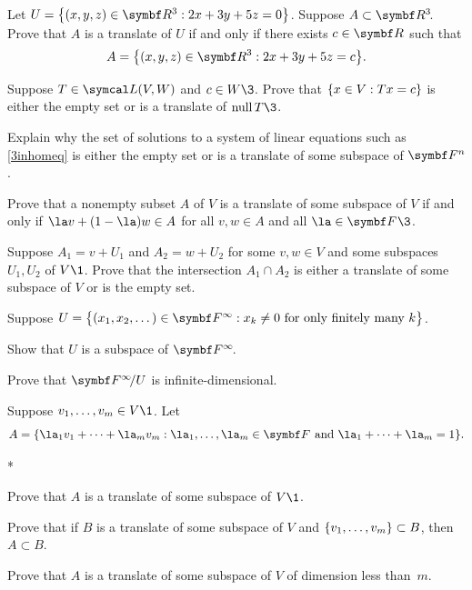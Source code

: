 \begin{exercises}
\exercise
Let $U = \br[\big]{ (x, y, z) \in \R3: 2x + 3y + 5z= 0}$. Suppose $A \subset \RR3$. Prove that $A$ is a translate of $U$ if and only if there exists $c \in \R{}$ such that\label{3translates}
\[
A = \br[\big]{ (x, y, z) \in \R3: 2x + 3y + 5z= c}.
\]
\exercisedisplayend


\exercise
\begin{SUBtheorem}
\item
Suppose $T \in \L(V, W)$ and $c \in W\3$. Prove that $\{x \in V : Tx = c\}$ is either the empty set or is a translate of
$\ker T\3$.

\item
Explain why the set of solutions to a system of linear equations such as \ref{3inhomeq} is either the empty set or is a translate of some subspace of $\FF n$.
\end{SUBtheorem}


\exercise
Prove that a nonempty subset $A$ of $V$ is a translate of some subspace of $V$ if and only if $\la v + (1-\la)w \in A$ for all $v, w \in A$ and all $\la \in \F{}\3$. \label{affine}


\exercise
Suppose $A_1 = v + U_1$ and $A_2 = w + U_2$ for some $v, w \in V$ and some subspaces $U_1, U_2$ of $V\1$. Prove that the intersection $A_1 \cap A_2$ is either a translate of some subspace of $V$ or is the empty set.

\pagebreak[4]


\exercise
Suppose $U = \br[\big]{(x_1, x_2, \dots) \in \F{\infty}: x_k \ne 0\ \text{for only finitely many}\ k}$.
\begin{subtheorem}
\item
Show that $U$ is a subspace of $\FF{\infty}$.
\item
Prove that $\FF{\infty}/U$ is infinite-dimensional.
\end{subtheorem}
\exercisesubtheoremend


\exercise
Suppose $v_1, \dots, v_m \in V\1$. Let
\[
A = \{ \la_1 v_1 + \dots + \la_m v_m : \la_1, \dots, \la_m \in \F{}\ \text{and}\ \la_1 + \dots + \la_m = 1 \}.
\]
\begin{subtheorem}*
\item
Prove that $A$ is a translate of some subspace of $V\1$.
\item
Prove that if $B$ is a translate of some subspace of $V$ and $\{v_1, \dots, v_m\} \subset B$, then $A \subset B$.
\item
Prove that $A$ is a translate of some subspace of $V$ of dimension less than~$m$.
\end{subtheorem}
\exercisesubtheoremend



\end{exercises}
